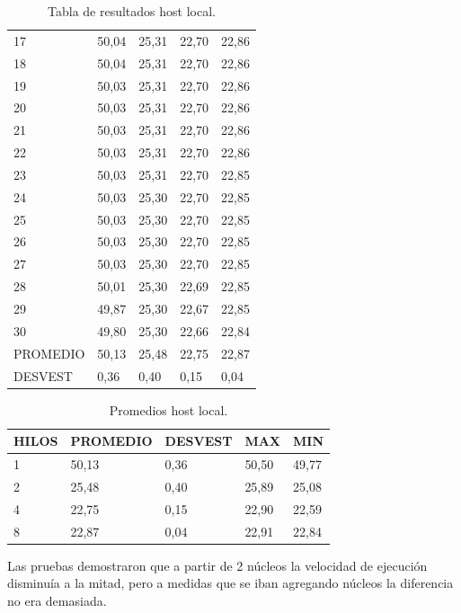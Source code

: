 \documentclass[a4paper]{article}
\begin{document}
\begin{table}[]
\begin{tabular}{lllll}
17      & 50,04 & 25,31 & 22,70 & 22,86 \\
18      & 50,04 & 25,31 & 22,70 & 22,86 \\
19      & 50,03 & 25,31 & 22,70 & 22,86 \\
20      & 50,03 & 25,31 & 22,70 & 22,86 \\
21      & 50,03 & 25,31 & 22,70 & 22,86 \\
22      & 50,03 & 25,31 & 22,70 & 22,86 \\
23      & 50,03 & 25,31 & 22,70 & 22,85 \\
24      & 50,03 & 25,30 & 22,70 & 22,85 \\
25      & 50,03 & 25,30 & 22,70 & 22,85 \\
26      & 50,03 & 25,30 & 22,70 & 22,85 \\
27      & 50,03 & 25,30 & 22,70 & 22,85 \\
28      & 50,01 & 25,30 & 22,69 & 22,85 \\
29      & 49,87 & 25,30 & 22,67 & 22,85 \\
30      & 49,80 & 25,30 & 22,66 & 22,84 \\ \hline
PROMEDIO & 50,13                 & 25,48                 & 22,75                 & 22,87                 \\
DESVEST & 0,36  & 0,40  & 0,15  & 0,04  \\ \hline
\end{tabular}
\caption{Tabla de resultados host local.}
\label{tab:tablanotebook}
\end{table}

\begin{table}[]
\centering
\begin{tabular}{lllll}
\textbf{HILOS} & \textbf{PROMEDIO} & \textbf{DESVEST} & \textbf{MAX}   & \textbf{MIN}   \\ \hline
1     & 50,13    & 0,36    & 50,50 & 49,77 \\
2     & 25,48    & 0,40    & 25,89 & 25,08 \\
4     & 22,75    & 0,15    & 22,90 & 22,59 \\
8     & 22,87    & 0,04    & 22,91 & 22,84
\end{tabular}
\caption{Promedios host local.}
\label{tab:tabpromnote}
\end{table}

Las pruebas demostraron que a partir de 2 núcleos la velocidad de ejecución disminuía a la mitad, pero a medidas que se iban agregando núcleos la diferencia no era demasiada.
\end{document}
